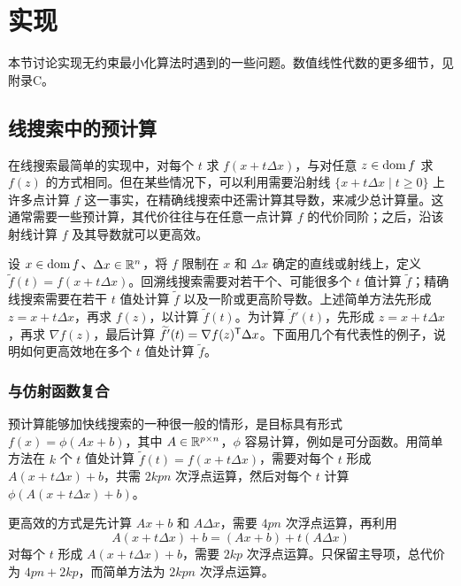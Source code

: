 \section{实现}
本节讨论实现无约束最小化算法时遇到的一些问题。数值线性代数的更多细节，见附录C。

\subsection{线搜索中的预计算}
在线搜索最简单的实现中，对每个 $t$ 求 $f(x+t\Delta x)$，与对任意 $z\in\operatorname{dom} f$ 求 $f(z)$ 的方式相同。但在某些情况下，可以利用需要沿射线 $\{x+t\Delta x\mid t\ge0\}$ 上许多点计算 $f$ 这一事实，在精确线搜索中还需计算其导数，来减少总计算量。这通常需要一些预计算，其代价往往与在任意一点计算 $f$ 的代价同阶；之后，沿该射线计算 $f$ 及其导数就可以更高效。

设 $x\in\operatorname{dom} f$、$\Delta x\in\mathbb R^n$，将 $f$ 限制在 $x$ 和 $\Delta x$ 确定的直线或射线上，定义 $\widetilde f(t)=f(x+t\Delta x)$。回溯线搜索需要对若干个、可能很多个 $t$ 值计算 $\widetilde f$；精确线搜索需要在若干 $t$ 值处计算 $\widetilde f$ 以及一阶或更高阶导数。上述简单方法先形成 $z=x+t\Delta x$，再求 $f(z)$，以计算 $\widetilde f(t)$。为计算 $\widetilde f'(t)$，先形成 $z=x+t\Delta x$，再求 $\nabla f(z)$，最后计算 $\widetilde f'(t)=\nabla f(z)^\mathsf T\Delta x$。下面用几个有代表性的例子，说明如何更高效地在多个 $t$ 值处计算 $\widetilde f$。

\subsubsection*{与仿射函数复合}
预计算能够加快线搜索的一种很一般的情形，是目标具有形式 $f(x)=\phi(Ax+b)$，其中 $A\in\mathbb R^{p\times n}$，$\phi$ 容易计算，例如是可分函数。用简单方法在 $k$ 个 $t$ 值处计算 $\widetilde f(t)=f(x+t\Delta x)$，需要对每个 $t$ 形成 $A(x+t\Delta x)+b$，共需 $2kpn$ 次浮点运算，然后对每个 $t$ 计算 $\phi(A(x+t\Delta x)+b)$。

更高效的方式是先计算 $Ax+b$ 和 $A\Delta x$，需要 $4pn$ 次浮点运算，再利用
\[
 A(x+t\Delta x)+b=(Ax+b)+t(A\Delta x)
\]
对每个 $t$ 形成 $A(x+t\Delta x)+b$，需要 $2kp$ 次浮点运算。只保留主导项，总代价为 $4pn+2kp$，而简单方法为 $2kpn$ 次浮点运算。

